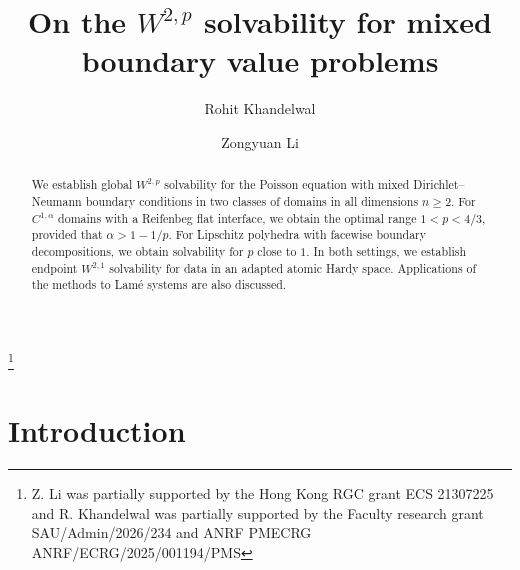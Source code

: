\documentclass[12pt]{amsart}
\numberwithin{equation}{section}
\begin{document}
\title[Mixed problems]{On the $W^{2,p}$ solvability for mixed boundary value problems}

\author[R. Khandelwal]{Rohit Khandelwal}
\address[R. Khandelwal]{Faculty of Mathematical Sciences (FMS), South Asian University, New Delhi, India 110068}

\author[Z. Li]{Zongyuan Li}
\address[Z. Li]{Department of Mathematics, City University of Hong Kong, 83 Tat Chee Avenue, Kowloon Tong, Hong Kong SAR}
\thanks{Z. Li was partially supported by the Hong Kong RGC grant ECS 21307225 and R. Khandelwal was partially supported by the Faculty research grant SAU/Admin/2026/234 and ANRF PMECRG ANRF/ECRG/2025/001194/PMS}



\begin{abstract}
We establish global $W^{2,p}$ solvability for the Poisson equation with mixed Dirichlet--Neumann boundary conditions in two classes of domains in all dimensions $n\geq 2$. For $C^{1,\alpha}$ domains with a Reifenbeg flat interface, we obtain the optimal range $1<p<4/3$, provided that $\alpha>1-1/p$.
For Lipschitz polyhedra with facewise boundary decompositions, we obtain solvability for $p$ close to $1$. In both settings, we establish endpoint $W^{2,1}$ solvability for data in an adapted atomic Hardy space.
Applications of the methods to Lam\'e systems are also discussed.
\end{abstract}

\maketitle

\section{Introduction}
\label{sec-introduction}
\end{document}
